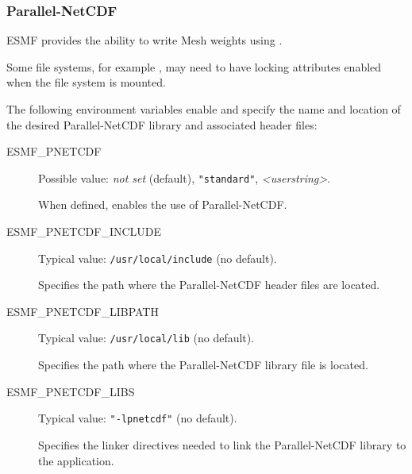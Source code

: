 \subsubsection{Parallel-NetCDF}
\label{sec:pnetcdf}
ESMF provides the ability to write Mesh weights using 
.

Some file systems, for example , may need
to have locking attributes enabled when the file system is mounted.

The following environment variables enable and specify the name and 
location of the desired Parallel-NetCDF library and associated header files:

\begin{description}
\item[ESMF\_PNETCDF] Possible value: {\it not set} (default), 
{\tt "standard"}, {\it <userstring>}.  

When defined, enables the use of Parallel-NetCDF.


\item[ESMF\_PNETCDF\_INCLUDE] Typical value: {\tt /usr/local/include} 
(no default).

Specifies the path where the Parallel-NetCDF header files are located.

\item[ESMF\_PNETCDF\_LIBPATH] Typical value: {\tt /usr/local/lib} (no default).

Specifies the path where the Parallel-NetCDF library file is located.

\item[ESMF\_PNETCDF\_LIBS] Typical value: {\tt "-lpnetcdf"} (no default).

Specifies the linker directives needed to link the Parallel-NetCDF library to the
application.
\end{description}

